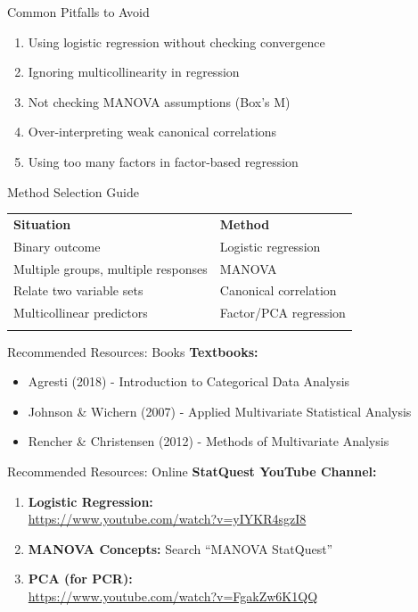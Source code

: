 \documentclass[aspectratio=169,ignorenonframetext]{beamer}
\begin{document}
\begin{frame}{Common Pitfalls to Avoid}
\begin{enumerate}
\item
  Using logistic regression without checking convergence
\item
  Ignoring multicollinearity in regression
\item
  Not checking MANOVA assumptions (Box's M)
\item
  Over-interpreting weak canonical correlations
\item
  Using too many factors in factor-based regression
\end{enumerate}
\end{frame}

\begin{frame}{Method Selection Guide}
{\def\LTcaptype{none} %
\begin{longtable}[]{@{}
  >{\raggedright\arraybackslash}p{}
  >{\raggedright\arraybackslash}p{}@{}}
\toprule\noalign{}
\endhead
\textbf{Situation} & \textbf{Method} \\
Binary outcome & Logistic regression \\
Multiple groups, multiple responses & MANOVA \\
Relate two variable sets & Canonical correlation \\
Multicollinear predictors & Factor/PCA regression \\
\bottomrule\noalign{}
\end{longtable}
}
\end{frame}

\begin{frame}{Recommended Resources: Books}
\textbf{Textbooks:}

\begin{itemize}
\item
  Agresti (2018) - Introduction to Categorical Data Analysis
\item
  Johnson \& Wichern (2007) - Applied Multivariate Statistical Analysis
\item
  Rencher \& Christensen (2012) - Methods of Multivariate Analysis
\end{itemize}
\end{frame}

\begin{frame}{Recommended Resources: Online}
\textbf{StatQuest YouTube Channel:}

\begin{enumerate}
\item
  \textbf{Logistic Regression:}\\
  \url{https://www.youtube.com/watch?v=yIYKR4sgzI8}
\item
  \textbf{MANOVA Concepts:} Search ``MANOVA StatQuest''
\item
  \textbf{PCA (for PCR):}\\
  \url{https://www.youtube.com/watch?v=FgakZw6K1QQ}
\end{enumerate}
\end{frame}
\end{document}
